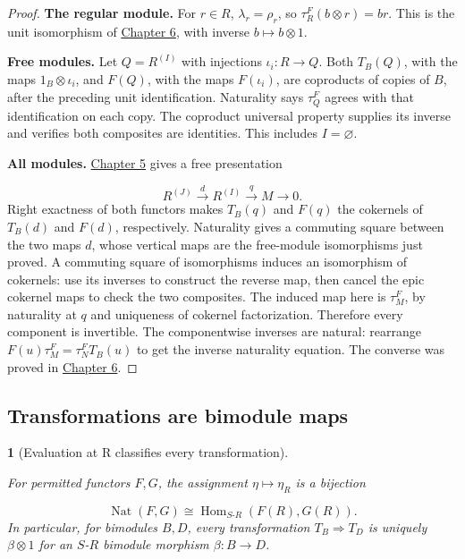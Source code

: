 \documentclass[11pt,a4paper]{article}
\newcommand{\mathheading}{}
\theoremstyle{plain}
\newtheorem*{plainstatement}{\mathheading}
\theoremstyle{definition}
\newenvironment{mathstatement}[3]{\renewcommand{\mathheading}{#1 #2}\begin{plainstatement}[#3]}{\end{plainstatement}}
\begin{document}
\begin{proof}

\textbf{The regular module.} For \(r\in R\), \(\lambda_r=\rho_r\), so \(\tau^F_R(b\otimes r)=br\). This is the unit isomorphism of \hyperref[chapter-06]{Chapter 6}, with inverse \(b\mapsto b\otimes1\).

 
\textbf{Free modules.} Let \(Q=R^{(I)}\) with injections \(\iota_i:R\to Q\). Both \(T_B(Q)\), with the maps \(1_B\otimes\iota_i\), and \(F(Q)\), with the maps \(F(\iota_i)\), are coproducts of copies of \(B\), after the preceding unit identification. Naturality says \(\tau^F_Q\) agrees with that identification on each copy. The coproduct universal property supplies its inverse and verifies both composites are identities. This includes \(I=\varnothing\).

 
\textbf{All modules.} \hyperref[chapter-05]{Chapter 5} gives a free presentation

 \[R^{(J)}\xrightarrow dR^{(I)}\xrightarrow qM\longrightarrow0.\] 
Right exactness of both functors makes \(T_B(q)\) and \(F(q)\) the cokernels of \(T_B(d)\) and \(F(d)\), respectively. Naturality gives a commuting square between the two maps \(d\), whose vertical maps are the free-module isomorphisms just proved. A commuting square of isomorphisms induces an isomorphism of cokernels: use its inverses to construct the reverse map, then cancel the epic cokernel maps to check the two composites. The induced map here is \(\tau^F_M\), by naturality at \(q\) and uniqueness of cokernel factorization. Therefore every component is invertible. The componentwise inverses are natural: rearrange \(F(u)\tau^F_M=\tau^F_NT_B(u)\) to get the inverse naturality equation. The converse was proved in \hyperref[chapter-06]{Chapter 6}.


\end{proof}
 
\subsection{Transformations are bimodule maps}
\label{transformations}

\begin{mathstatement}{Theorem}{9.5}{Evaluation at R classifies every transformation}
\label{env-9-5}

For permitted functors \(F,G\), the assignment \(\eta\mapsto\eta_R\) is a bijection

 \[\operatorname{Nat}(F,G)\cong\operatorname{Hom}_{S\text{-}R}(F(R),G(R)).\] 
In particular, for bimodules \(B,D\), every transformation \(T_B\Rightarrow T_D\) is uniquely \(\beta\otimes1\) for an \(S\)-\(R\) bimodule morphism \(\beta:B\to D\).


\par{}\par

\end{mathstatement}
 
\end{document}
